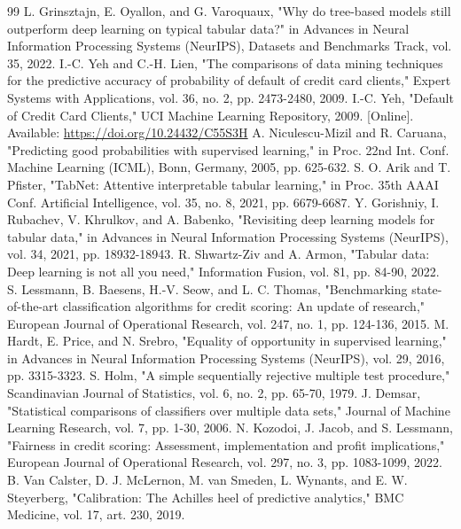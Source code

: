 \begin{thebibliography}{99}
 L. Grinsztajn, E. Oyallon, and G. Varoquaux, "Why do tree-based models still outperform deep learning on typical tabular data?" in Advances in Neural Information Processing Systems (NeurIPS), Datasets and Benchmarks Track, vol. 35, 2022.
 I.-C. Yeh and C.-H. Lien, "The comparisons of data mining techniques for the predictive accuracy of probability of default of credit card clients," Expert Systems with Applications, vol. 36, no. 2, pp. 2473-2480, 2009.
 I.-C. Yeh, "Default of Credit Card Clients," UCI Machine Learning Repository, 2009. [Online]. Available: \url{https://doi.org/10.24432/C55S3H}
 A. Niculescu-Mizil and R. Caruana, "Predicting good probabilities with supervised learning," in Proc. 22nd Int. Conf. Machine Learning (ICML), Bonn, Germany, 2005, pp. 625-632.
 S. O. Arik and T. Pfister, "TabNet: Attentive interpretable tabular learning," in Proc. 35th AAAI Conf. Artificial Intelligence, vol. 35, no. 8, 2021, pp. 6679-6687.
 Y. Gorishniy, I. Rubachev, V. Khrulkov, and A. Babenko, "Revisiting deep learning models for tabular data," in Advances in Neural Information Processing Systems (NeurIPS), vol. 34, 2021, pp. 18932-18943.
 R. Shwartz-Ziv and A. Armon, "Tabular data: Deep learning is not all you need," Information Fusion, vol. 81, pp. 84-90, 2022.
 S. Lessmann, B. Baesens, H.-V. Seow, and L. C. Thomas, "Benchmarking state-of-the-art classification algorithms for credit scoring: An update of research," European Journal of Operational Research, vol. 247, no. 1, pp. 124-136, 2015.
 M. Hardt, E. Price, and N. Srebro, "Equality of opportunity in supervised learning," in Advances in Neural Information Processing Systems (NeurIPS), vol. 29, 2016, pp. 3315-3323.
 S. Holm, "A simple sequentially rejective multiple test procedure," Scandinavian Journal of Statistics, vol. 6, no. 2, pp. 65-70, 1979.
 J. Demsar, "Statistical comparisons of classifiers over multiple data sets," Journal of Machine Learning Research, vol. 7, pp. 1-30, 2006.
 N. Kozodoi, J. Jacob, and S. Lessmann, "Fairness in credit scoring: Assessment, implementation and profit implications," European Journal of Operational Research, vol. 297, no. 3, pp. 1083-1099, 2022.
 B. Van Calster, D. J. McLernon, M. van Smeden, L. Wynants, and E. W. Steyerberg, "Calibration: The Achilles heel of predictive analytics," BMC Medicine, vol. 17, art. 230, 2019.
\end{thebibliography}
